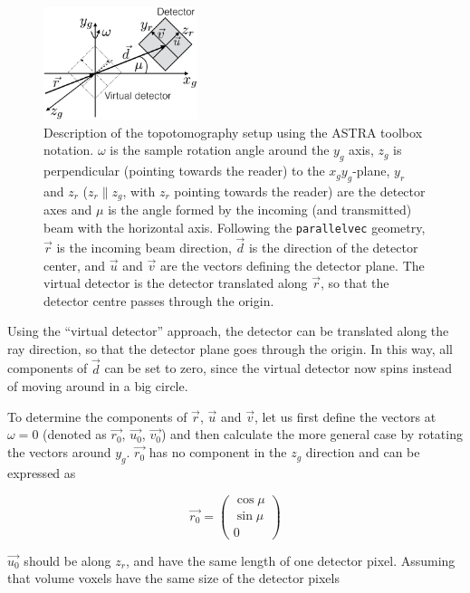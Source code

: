 \documentclass[11pt]{scrartcl}
\begin{document}
\begin{figure}[h]
    \centering
    \includegraphics[width=0.4\textwidth]{geom_setup.png}
    \caption{Description of the topotomography setup using the {\footnotesize{ASTRA}} toolbox notation. $\omega$ is the sample rotation angle around the $y_g$ axis, $z_g$ is perpendicular (pointing towards the reader) to the $x_gy_g$-plane, $y_r$ and $z_r$ ($z_r \parallel z_g$, with $z_r$ pointing towards the reader) are the detector axes and $\mu$ is the angle formed by the incoming (and transmitted) beam with the horizontal axis. Following the {\texttt{parallel\textunderscore vec}} geometry, ${\vec{r}}$ is the incoming beam direction, ${\vec{d}}$ is the direction of the detector center, and ${\vec{u}}$ and ${\vec{v}}$ are the vectors defining the detector plane. The virtual detector is the detector translated along $\vec{r}$, so that the detector centre passes through the origin.}
    \label{fig:geom_setup}
\end{figure}

Using the ``virtual detector'' approach, the detector can be translated along the ray direction, so that the detector plane goes through the origin. In this way, all components of ${\vec{d}}$ can be set to zero, since the virtual detector now spins instead of moving around in a big circle.

To determine the components of ${\vec{r}}$, ${\vec{u}}$ and ${\vec{v}}$, let us first define the vectors at $\omega = 0$ (denoted as ${\vec{r_0}}$, ${\vec{u_0}}$, ${\vec{v_0}}$) and then calculate the more general case by rotating the vectors around $y_g$. ${\vec{r_0}}$ has no component in the $z_g$ direction and can be expressed as

\begin{equation}
{\vec{r_0}} = \left(\begin{matrix}
\cos\mu\\ \sin \mu\\ 0
\end{matrix}\right)
\end{equation}

${\vec{u_0}}$ should be along $z_r$, and have the same length of one detector pixel. Assuming that volume voxels have the same size of the detector pixels
\end{document}
